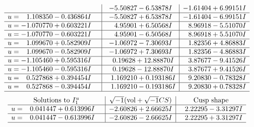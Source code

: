 \documentclass[1p]{elsarticle_modified}
\theoremstyle{definition}
\newcommand{\I}{\sqrt{-1}}
\begin{document}
$$\begin{array}{c|c|c}
 & -5.50827 - 6.53878 I & -1.61404 + 6.99151 I \\ \hline\begin{aligned}
u &= \phantom{-}1.108350 - 0.436864 I\end{aligned}
 & -5.50827 + 6.53878 I & -1.61404 - 6.99151 I \\ \hline\begin{aligned}
u &= -1.070770 + 0.603221 I\end{aligned}
 & \phantom{-}4.95901 + 6.50568 I & \phantom{-}8.96918 - 5.51070 I \\ \hline\begin{aligned}
u &= -1.070770 - 0.603221 I\end{aligned}
 & \phantom{-}4.95901 - 6.50568 I & \phantom{-}8.96918 + 5.51070 I \\ \hline\begin{aligned}
u &= \phantom{-}1.099670 + 0.582909 I\end{aligned}
 & -1.06972 - 7.30693 I & \phantom{-}1.82356 + 4.86883 I \\ \hline\begin{aligned}
u &= \phantom{-}1.099670 - 0.582909 I\end{aligned}
 & -1.06972 + 7.30693 I & \phantom{-}1.82356 - 4.86883 I \\ \hline\begin{aligned}
u &= -1.105460 + 0.595316 I\end{aligned}
 & \phantom{-}0.19628 + 12.88870 I & \phantom{-}3.87677 - 9.41526 I \\ \hline\begin{aligned}
u &= -1.105460 - 0.595316 I\end{aligned}
 & \phantom{-}0.19628 - 12.88870 I & \phantom{-}3.87677 + 9.41526 I \\ \hline\begin{aligned}
u &= \phantom{-}0.527868 + 0.394454 I\end{aligned}
 & \phantom{-}1.169210 + 0.193186 I & \phantom{-}9.20830 - 0.78328 I \\ \hline\begin{aligned}
u &= \phantom{-}0.527868 - 0.394454 I\end{aligned}
 & \phantom{-}1.169210 - 0.193186 I & \phantom{-}9.20830 + 0.78328 I\\
 \hline 
 \end{array}$$\newpage$$\begin{array}{c|c|c}  
\text{Solutions to }I^u_{1}& \I (\text{vol} + \sqrt{-1}CS) & \text{Cusp shape}\\
 \hline 
\begin{aligned}
u &= \phantom{-}0.041447 + 0.613996 I\end{aligned}
 & -2.60826 + 2.66625 I & \phantom{-}2.22295 - 3.31297 I \\ \hline\begin{aligned}
u &= \phantom{-}0.041447 - 0.613996 I\end{aligned}
 & -2.60826 - 2.66625 I & \phantom{-}2.22295 + 3.31297 I\\
 \hline 
 \end{array}$$\newpage\newpage\renewcommand{\arraystretch}{1}
\end{document}
